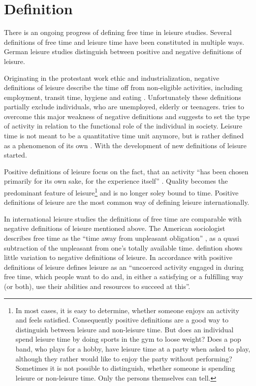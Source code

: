 \documentclass[12pt,numbers=noenddot,parskip,bibliography=totocnumbered,listof=totocnumbered]{scrreprt}
\begin{document}
\section{Definition}

There is an ongoing progress of defining free time in leisure studies. Several definitions of free time and leisure time have been constituted in multiple ways. German leisure studies distinguish between positive and negative definitions of leisure. 

Originating in the protestant work ethic \citep[p.27]{weber2006} and industrialization, negative definitions of leisure describe the time off from non-eligible activities, including employment, transit time, hygiene and eating \citep[p.137]{prahl2002}. Unfortunately these definitions partially exclude individuals, who are unemployed, elderly or teenagers. \citeauthor{scheuch1972} tries to overcome this major weakness of negative definitions and suggests to set the type of activity in relation to the functional role of the individual in society. Leisure time is not meant to be a quantitative time unit anymore, but is rather defined as a phenomenon of its own \citep[p.31]{scheuch1972}. With \citeauthor{scheuch1972} the development of new definitions of leisure started.

Positive definitions of leisure focus on the fact, that an activity ``has been chosen primarily for its own sake, for the experience itself'' \citep[p.15]{freysinger2000}. Quality becomes the predominant feature of leisure\footnote{In most cases, it is easy to determine, whether someone enjoys an activity and feels satisfied. Consequently positive definitions are a good way to distinguish between leisure and non-leisure time. But does an individual spend leisure time by doing sports in the gym to loose weight? Does a pop band, who plays for a hobby, have leisure time at a party when asked to play, although they rather would like to enjoy the party without performing? Sometimes it is not possible to distinguish, whether someone is spending leisure or non-leisure time. Only the persons themselves can tell.} and is no longer soley bound to time. Positive definitions of leisure are the most common way of defining leisure internationally.

In international leisure studies the definitions of free time are comparable with negative definitions of leisure mentioned above. The American sociologist \citeauthor{stebbins2007} describes free time as the ``time away from unpleasant obligation'' \cite[p.4]{stebbins2007}, as a quasi subtraction of the unpleasant from one's totally available time. \citeauthor{stebbins2007} defintion shows little variation to negative definitions of leisure. In accordance with positive definitions of leisure \citeauthor{stebbins2007} defines leisure as an ``uncoerced  activity engaged in during free time, which people want to do and, in either a satisfying or a fulfilling way (or both), use their abilities and resources to succeed at this''. 
\end{document}
